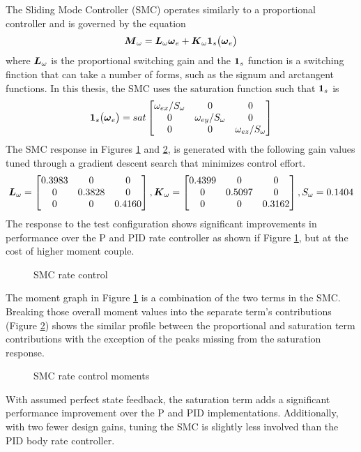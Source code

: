 The Sliding Mode Controller (SMC) operates similarly to a proportional controller and is governed by the equation
\begin{equation}
  \boldsymbol{M}_{\omega} = \boldsymbol{L}_{\omega} \boldsymbol{\omega}_e + \boldsymbol{K}_{\omega}\boldsymbol{1}_s \big(\boldsymbol{\omega}_e \big)
  \label{eqn:SMController}
\end{equation}
where $\boldsymbol{L}_{\omega}$ is the proportional switching gain and the $\boldsymbol{1}_s$ function is a switching finction that can take a number of forms, such as the signum and arctangent functions.  In this thesis, the SMC uses the saturation function such that $\boldsymbol{1}_s$ is
\begin{equation}
  \boldsymbol{1}_s \big(\boldsymbol{\omega}_e \big) = sat \begin{bmatrix} \omega_{ex} / S_{\omega} &0 &0 \\ 0 & \omega_{ey} / S_{\omega} & 0 \\ 0 & 0 & \omega_{ez} / S_{\omega} \end{bmatrix}
\end{equation}
The SMC response in Figures \ref{fig:SMCRateControl} and \ref{fig:SMCRateControlMoments}, is generated with the following gain values tuned through a gradient descent search that minimizes control effort.
\begin{equation}
    \boldsymbol{L}_{\omega} = \begin{bmatrix} 0.3983 & 0 & 0 \\ 0 & 0.3828 & 0 \\ 0 & 0 & 0.4160 \end{bmatrix},
    \boldsymbol{K}_{\omega} = \begin{bmatrix} 0.4399 & 0 & 0 \\ 0 & 0.5097 & 0 \\ 0 & 0 & 0.3162 \end{bmatrix},
    S_{\omega} = 0.1404
  \label{SMCRateControlGains}
\end{equation}
The response to the test configuration shows significant improvements in performance over the P and PID rate controller as shown if Figure \ref{fig:SMCRateControl}, but at the cost of higher moment couple.
\begin{figure}[H]
  \centerline{}
  \caption{SMC rate control}
  \label{fig:SMCRateControl}
\end{figure}
The moment graph in Figure \ref{fig:SMCRateControl} is a combination of the two terms in the SMC.  Breaking those overall moment values into the separate term's contributions (Figure \ref{fig:SMCRateControlMoments}) shows the similar profile between the proportional and saturation term contributions with the exception of the peaks missing from the saturation response.
\begin{figure}[H]
  \centerline{}
  \caption{SMC rate control moments}
  \label{fig:SMCRateControlMoments}
\end{figure}
With assumed perfect state feedback, the saturation term adds a significant performance improvement over the P and PID implementations.  Additionally, with two fewer design gains, tuning the SMC is slightly less involved than the PID body rate controller.

